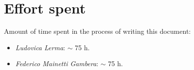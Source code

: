 \section{Effort spent}
\label{sect:effortspent}

Amount of time spent in the process of writing this document:
\begin{itemize}
    \item \textit{Ludovica Lerma}: $\sim$ 75 h.
    \item \textit{Federico Mainetti Gambera}: $\sim$ 75 h.
\end{itemize}